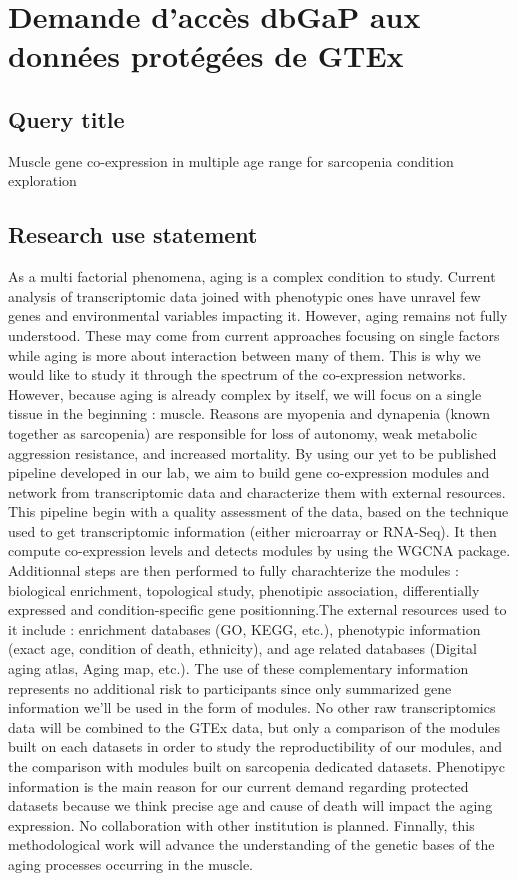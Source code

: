 \chapter{Demande d'accès dbGaP aux données protégées de GTEx}

\label{annexe:dbgap}

\section{Query title}
Muscle gene co-expression in multiple age range for sarcopenia condition exploration

\section{Research use statement}
As a multi factorial phenomena, aging is a complex condition to study. Current analysis of transcriptomic data joined with phenotypic ones have unravel few genes and environmental variables impacting it. However, aging remains not fully understood. These may come from current approaches focusing on single factors while aging is more about interaction between many of them. This is why we would like to study it through the spectrum of the co-expression networks. However, because aging is already complex by itself, we will focus on a single tissue in the beginning : muscle. Reasons are myopenia and dynapenia (known together as sarcopenia) are responsible for loss of autonomy, weak metabolic aggression resistance, and increased mortality.
By using our yet to be published pipeline developed in our lab, we aim to build gene co-expression modules and network from transcriptomic data and characterize them with external resources. This pipeline begin with a quality assessment of the data, based on the technique used to get transcriptomic information (either microarray or RNA-Seq). It then compute co-expression levels and detects modules by using the WGCNA package. Additionnal steps are then performed to fully charachterize the modules : biological enrichment, topological study, phenotipic association, differentially expressed and condition-specific gene positionning.The external resources used to it include : enrichment databases (GO, KEGG, etc.), phenotypic information (exact age, condition of death, ethnicity), and age related databases (Digital aging atlas, Aging map, etc.). The use of these complementary information represents no additional risk to participants since only summarized gene information we'll be used in the form of modules. No other raw transcriptomics data will be combined to the GTEx data, but only a comparison of the modules built on each datasets in order to study the reproductibility of our modules, and the comparison with modules built on sarcopenia dedicated datasets.
Phenotipyc information is the main reason for our current demand regarding protected datasets because we think precise age and cause of death will impact the aging expression. 
No collaboration with other institution is planned.
Finnally, this methodological work will advance the understanding of the genetic bases of the aging processes occurring in the muscle.


